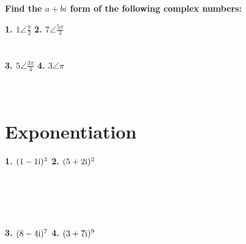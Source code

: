\textbf{Find the $a + bi$ form of the following complex numbers:}

\textbf{1. $1\angle\frac{\pi}{2}$} \phantom{XXXXXXXXXXXXXXXX}
\textbf{2. $7\angle\frac{5\pi}{3}$} \\\\\\
\textbf{3. $5\angle\frac{3\pi}{4}$} \phantom{XXXXXXXXXXXXXXXX}
\textbf{4. $3\angle\pi$} \\\\\\

\section*{Exponentiation}
\textbf{1. $(1 - 1\mathrm{i})^3$} \phantom{XXXXXXXXXXXXXX}
\textbf{2. $(5 + 2\mathrm{i})^2$} \\\\\\\\\\\\
\textbf{3. $(8 - 4\mathrm{i})^7$} \phantom{XXXXXXXXXXXXXX}
\textbf{4. $(3 + 7\mathrm{i})^9$}
